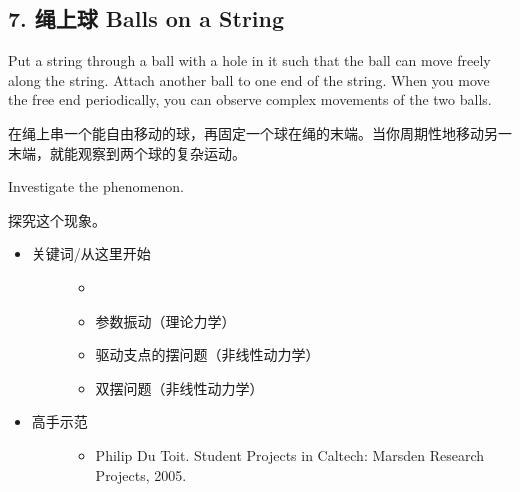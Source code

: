 \documentclass[a4paper,10pt,english]{sphinxmanual}
\begin{document}
\subsection{7. 绳上球 Balls on a String}
\label{\detokenize{8. Appendix:balls-on-a-string}}
Put a string through a ball with a hole in it such that the ball can move freely along the string. Attach another ball to one end of the string. When you move the free end periodically, you can observe complex movements of the two balls.

在绳上串一个能自由移动的球，再固定一个球在绳的末端。当你周期性地移动另一末端，就能观察到两个球的复杂运动。

Investigate the phenomenon.

探究这个现象。

\noindent{}
\begin{itemize}
\item {} \begin{description}
\item[{关键词/从这里开始}] \leavevmode\begin{itemize}
\item {} 

\item {} 
参数振动（理论力学）

\item {} 
驱动支点的摆问题（非线性动力学）

\item {} 
双摆问题（非线性动力学）

\end{itemize}

\end{description}

\item {} \begin{description}
\item[{高手示范}] \leavevmode\begin{itemize}
\item {} 
Philip Du Toit.  Student Projects in Caltech: Marsden Research Projects, 2005.

\end{itemize}

\end{description}


\end{itemize}
\end{document}
